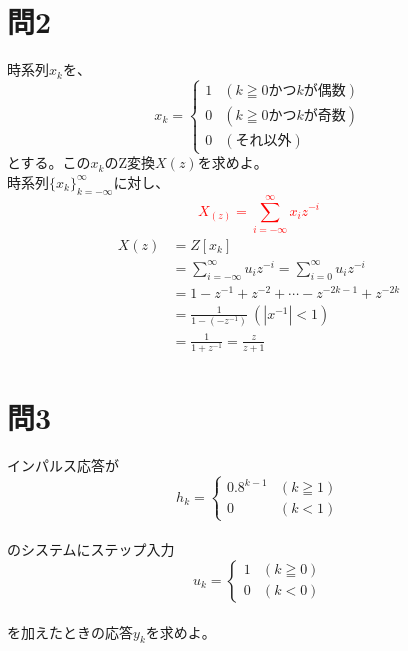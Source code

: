 \documentclass[a4paper,11pt]{ltjsarticle}
\begin{document}
\section*{問2}
時系列$x_{k}$を、\\
\begin{equation*}
  x_{k} =
  \begin{cases}
    1 & (k \geqq 0かつkが偶数) \\
    0 & (k \geqq 0かつkが奇数) \\
    0 & (それ以外)
  \end{cases}
\end{equation*}
とする。この$x_{k}$のZ変換$X(z)$を求めよ。\\
時系列$\lbrace{x_{k}}\rbrace^{\infty}_{k=-\infty}$に対し、\\
\textcolor{red}{
\begin{equation}
  X_(z) = \sum_{i = -\infty}^{\infty}x_{i}z^{-i}
\end{equation}
}
\begin{gather*}
  \begin{split}
    X(z) &= Z[x_{k}] \\
    &= \sum_{i =- \infty}^{\infty}u_{i}z^{-i} = \sum_{i=0}^{\infty}u_{i}z^{-i}\\
    &= 1 - z^{-1} + z^{-2} + \dotsb -z^{-2k-1} + z^{-2k} \\
    &= \frac{1}{1-(-z^{-1})} \ (|x^{-1}| < 1) \\
    &= \frac{1}{1+z^{-1}} = \frac{z}{z+1}
  \end{split}
\end{gather*}
\section*{問3}
インパルス応答が\\
\begin{equation*}
  h_{k}=
  \begin{cases*}
    0.8^{k-1} & (k \geqq 1) \\
    0 & (k < 1)
  \end{cases*}
\end{equation*}
\\のシステムにステップ入力\\
\begin{equation*}
  u_{k}=
  \begin{cases*}
    1 & (k \geqq 0) \\
    0 & (k < 0)
  \end{cases*}
\end{equation*}
\\
を加えたときの応答$y_{k}$を求めよ。
\end{document}
